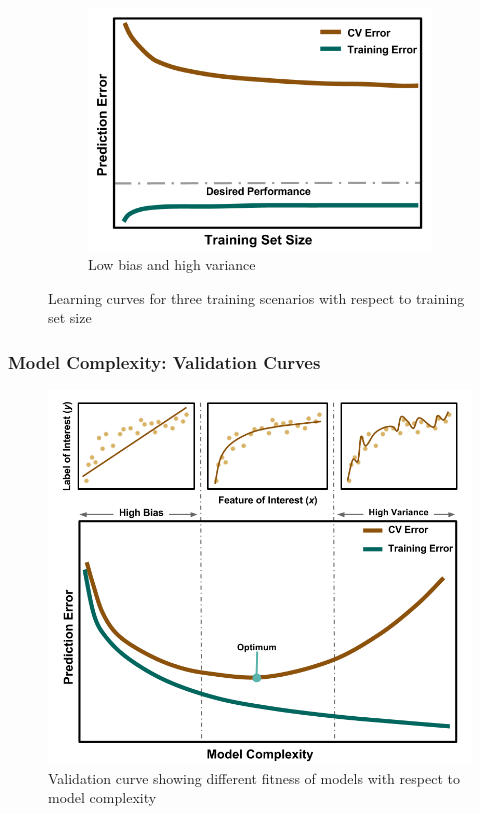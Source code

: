 \begin{frame}
\begin{figure}[h!]
\begin{subfigure}{0.33\textwidth}
      \includegraphics[width=\linewidth]{./figures/LearningCurve-variance.png}
      \caption{Low bias and high variance}
    \end{subfigure}
    \caption{Learning curves for three training scenarios with respect to training set size}
  \end{figure}
\end{frame}

\begin{frame}
  \frametitle{Model Complexity: Validation Curves}
  \begin{figure}[t!]
    \centering
    \includegraphics[height=0.75\textheight]{./figures/ValidationCurve.png}
    \caption{Validation curve showing different fitness of models with respect to model complexity}
  \end{figure}
\end{frame}

